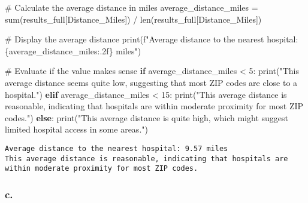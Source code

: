 \documentclass[
  letterpaper,
  DIV=11,
  numbers=noendperiod]{scrartcl}
\newenvironment{Shaded}{\begin{snugshade}}{\end{snugshade}}
\newcommand{\BuiltInTok}[1]{\textcolor[rgb]{0.00,0.23,0.31}{#1}}
\newcommand{\CommentTok}[1]{\textcolor[rgb]{0.37,0.37,0.37}{#1}}
\newcommand{\ControlFlowTok}[1]{\textcolor[rgb]{0.00,0.23,0.31}{\textbf{#1}}}
\newcommand{\DecValTok}[1]{\textcolor[rgb]{0.68,0.00,0.00}{#1}}
\newcommand{\NormalTok}[1]{\textcolor[rgb]{0.00,0.23,0.31}{#1}}
\newcommand{\OperatorTok}[1]{\textcolor[rgb]{0.37,0.37,0.37}{#1}}
\newcommand{\SpecialCharTok}[1]{\textcolor[rgb]{0.37,0.37,0.37}{#1}}
\newcommand{\SpecialStringTok}[1]{\textcolor[rgb]{0.13,0.47,0.30}{#1}}
\newcommand{\StringTok}[1]{\textcolor[rgb]{0.13,0.47,0.30}{#1}}
\begin{document}
\begin{Shaded}
\begin{Highlighting}[]
\CommentTok{\# Calculate the average distance in miles}
\NormalTok{average\_distance\_miles }\OperatorTok{=} \BuiltInTok{sum}\NormalTok{(results\_full[}\StringTok{\textquotesingle{}Distance\_Miles\textquotesingle{}}\NormalTok{]) }\OperatorTok{/} \BuiltInTok{len}\NormalTok{(results\_full[}\StringTok{\textquotesingle{}Distance\_Miles\textquotesingle{}}\NormalTok{])}

\CommentTok{\# Display the average distance}
\BuiltInTok{print}\NormalTok{(}\SpecialStringTok{f"Average distance to the nearest hospital: }\SpecialCharTok{\{}\NormalTok{average\_distance\_miles}\SpecialCharTok{:.2f\}}\SpecialStringTok{ miles"}\NormalTok{)}

\CommentTok{\# Evaluate if the value makes sense}
\ControlFlowTok{if}\NormalTok{ average\_distance\_miles }\OperatorTok{\textless{}} \DecValTok{5}\NormalTok{:}
    \BuiltInTok{print}\NormalTok{(}\StringTok{"This average distance seems quite low, suggesting that most ZIP codes are close to a hospital."}\NormalTok{)}
\ControlFlowTok{elif}\NormalTok{ average\_distance\_miles }\OperatorTok{\textless{}} \DecValTok{15}\NormalTok{:}
    \BuiltInTok{print}\NormalTok{(}\StringTok{"This average distance is reasonable, indicating that hospitals are within moderate proximity for most ZIP codes."}\NormalTok{)}
\ControlFlowTok{else}\NormalTok{:}
    \BuiltInTok{print}\NormalTok{(}\StringTok{"This average distance is quite high, which might suggest limited hospital access in some areas."}\NormalTok{)}
\end{Highlighting}
\end{Shaded}

\begin{verbatim}
Average distance to the nearest hospital: 9.57 miles
This average distance is reasonable, indicating that hospitals are within moderate proximity for most ZIP codes.
\end{verbatim}

\subsubsection{c.}\label{c.-2}
\end{document}
